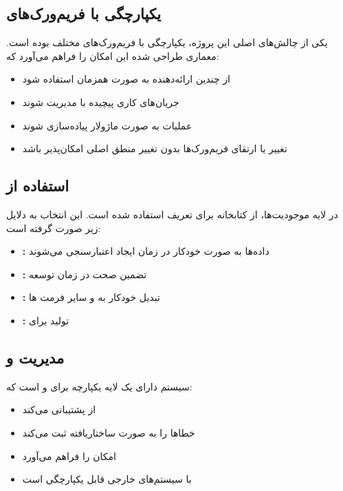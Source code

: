 \subsection{یکپارچگی با فریم‌ورک‌های }

یکی از چالش‌های اصلی این پروژه، یکپارچگی با فریم‌ورک‌های مختلف  بوده است. معماری طراحی شده این امکان را فراهم می‌آورد که:

\begin{itemize}
    \item از چندین ارائه‌دهنده  به صورت همزمان استفاده شود
    \item جریان‌های کاری پیچیده با  مدیریت شوند
    \item عملیات  به صورت ماژولار پیاده‌سازی شوند
    \item تغییر یا ارتقای فریم‌ورک‌ها بدون تغییر منطق اصلی امکان‌پذیر باشد
\end{itemize}

\subsection{استفاده از }

در لایه موجودیت‌ها، از کتابخانه  برای تعریف  استفاده شده است. این انتخاب به دلایل زیر صورت گرفته است:

\begin{itemize}
    \item \textbf{:} داده‌ها به صورت خودکار در زمان ایجاد  اعتبارسنجی می‌شوند
    \item \textbf{:} تضمین صحت  در زمان توسعه
    \item \textbf{:} تبدیل خودکار به  و سایر فرمت ها
    \item \textbf{:} تولید  برای 
\end{itemize}

\subsection{مدیریت  و }

سیستم دارای یک لایه یکپارچه برای  و  است که:

\begin{itemize}
    \item از  پشتیبانی می‌کند
    \item خطاها را به صورت ساختاریافته ثبت می‌کند
    \item امکان  را فراهم می‌آورد
    \item با سیستم‌های  خارجی قابل یکپارچگی است
\end{itemize}

